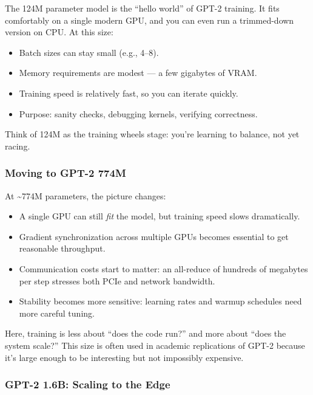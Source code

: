 \documentclass[
  letterpaper,
  DIV=11,
  numbers=noendperiod]{scrreprt}
\providecommand{\tightlist}{%
  \setlength{\itemsep}{0pt}\setlength{\parskip}{0pt}}
\begin{document}
The 124M parameter model is the ``hello world'' of GPT-2 training. It
fits comfortably on a single modern GPU, and you can even run a
trimmed-down version on CPU. At this size:

\begin{itemize}
\tightlist
\item
  Batch sizes can stay small (e.g., 4--8).
\item
  Memory requirements are modest --- a few gigabytes of VRAM.
\item
  Training speed is relatively fast, so you can iterate quickly.
\item
  Purpose: sanity checks, debugging kernels, verifying correctness.
\end{itemize}

Think of 124M as the training wheels stage: you're learning to balance,
not yet racing.

\subsubsection{Moving to GPT-2 774M}\label{moving-to-gpt-2-774m}

At \textasciitilde774M parameters, the picture changes:

\begin{itemize}
\tightlist
\item
  A single GPU can still \emph{fit} the model, but training speed slows
  dramatically.
\item
  Gradient synchronization across multiple GPUs becomes essential to get
  reasonable throughput.
\item
  Communication costs start to matter: an all-reduce of hundreds of
  megabytes per step stresses both PCIe and network bandwidth.
\item
  Stability becomes more sensitive: learning rates and warmup schedules
  need more careful tuning.
\end{itemize}

Here, training is less about ``does the code run?'' and more about
``does the system scale?'' This size is often used in academic
replications of GPT-2 because it's large enough to be interesting but
not impossibly expensive.

\subsubsection{GPT-2 1.6B: Scaling to the
Edge}\label{gpt-2-1.6b-scaling-to-the-edge}
\end{document}
